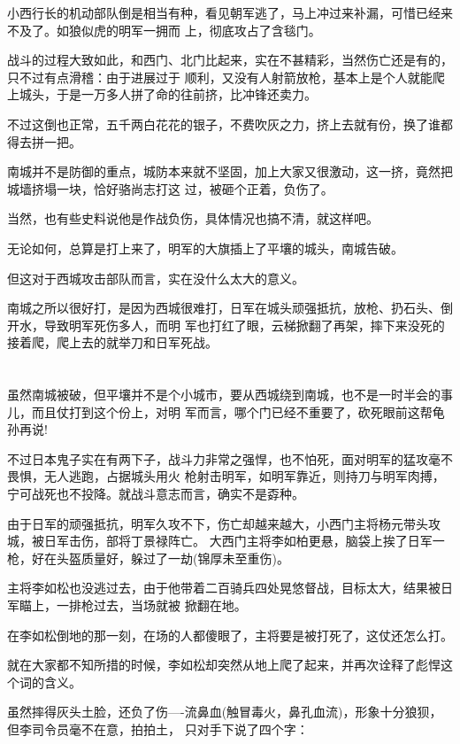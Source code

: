 \documentclass[11pt,a4paper,onecolumn]{article}
\begin{document}
小西行长的机动部队倒是相当有种，看见朝军逃了，马上冲过来补漏，可惜已经来不及了。如狼似虎的明军一拥而
上，彻底攻占了含毯门。

战斗的过程大致如此，和西门、北门比起来，实在不甚精彩，当然伤亡还是有的，只不过有点滑稽：由于进展过于
顺利，又没有人射箭放枪，基本上是个人就能爬上城头，于是一万多人拼了命的往前挤，比冲锋还卖力。

不过这倒也正常，五千两白花花的银子，不费吹灰之力，挤上去就有份，换了谁都得去拼一把。

南城并不是防御的重点，城防本来就不坚固，加上大家又很激动，这一挤，竟然把城墙挤塌一块，恰好骆尚志打这
过，被砸个正着，负伤了。

当然，也有些史料说他是作战负伤，具体情况也搞不清，就这样吧。

无论如何，总算是打上来了，明军的大旗插上了平壤的城头，南城告破。

但这对于西城攻击部队而言，实在没什么太大的意义。

南城之所以很好打，是因为西城很难打，日军在城头顽强抵抗，放枪、扔石头、倒开水，导致明军死伤多人，而明
军也打红了眼，云梯掀翻了再架，摔下来没死的接着爬，爬上去的就举刀和日军死战。

\section[\thesection]{}

虽然南城被破，但平壤并不是个小城市，要从西城绕到南城，也不是一时半会的事儿，而且仗打到这个份上，对明
军而言，哪个门已经不重要了，砍死眼前这帮龟孙再说!

不过日本鬼子实在有两下子，战斗力非常之强悍，也不怕死，面对明军的猛攻毫不畏惧，无人逃跑，占据城头用火
枪射击明军，如明军靠近，则持刀与明军肉搏，宁可战死也不投降。就战斗意志而言，确实不是孬种。

由于日军的顽强抵抗，明军久攻不下，伤亡却越来越大，小西门主将杨元带头攻城，被日军击伤，部将丁景禄阵亡。
大西门主将李如柏更悬，脑袋上挨了日军一枪，好在头盔质量好，躲过了一劫(锦厚未至重伤)。

主将李如松也没逃过去，由于他带着二百骑兵四处晃悠督战，目标太大，结果被日军瞄上，一排枪过去，当场就被
掀翻在地。

在李如松倒地的那一刻，在场的人都傻眼了，主将要是被打死了，这仗还怎么打。

就在大家都不知所措的时候，李如松却突然从地上爬了起来，并再次诠释了彪悍这个词的含义。

虽然摔得灰头土脸，还负了伤----流鼻血(触冒毒火，鼻孔血流)，形象十分狼狈，但李司令员毫不在意，拍拍土，
只对手下说了四个字：
\end{document}
